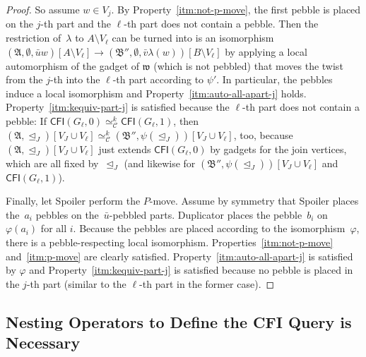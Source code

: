 \documentclass[]{lmcs}
\renewcommand{\phi}{\varphi}
\newcommand{\autoA}{\phi}
\newcommand{\autoB}{\psi}
\newcommand{\tup}[1]{\bar{#1}}
\newcommand{\vertA}{u}
\newcommand{\vertB}{v}
\newcommand{\vertC}{w}
\newcommand{\StructA}{\mathfrak{A}}
\newcommand{\StructB}{\mathfrak{B}}
\newcommand{\StructVA}{A}
\newcommand{\StructVB}{B}
\newcommand{\gamebij}{\lambda}
\newcommand{\CFIsym}{\mathsf{CFI}}
\newcommand{\CFI}[1]{\CFIsym(#1)}
\newcommand{\bVertC}{\mathfrak{w}}
\newcommand{\kequiv}[1]{\simeq^#1_{\mathcal{C}}}
\newcommand{\indRel}{\trianglelefteq}
\begin{document}
\begin{proof}
	So assume $\vertC \in V_j$.
	By Property~\ref{itm:not-p-move},
	the first pebble is placed on the $j$-th part
	and the $\ell$-th part does not contain a pebble.
	Then the restriction of~$\gamebij$ to $\StructVA \setminus V_\ell$
	can be turned into 
	is an isomorphism $ (\StructA, \emptyset, \tup{\vertA}\vertC)[\StructVA \setminus V_\ell] \to 
	(\StructB'', \emptyset, \tup{\vertB}\gamebij(\vertC))[\StructVB \setminus V_\ell]$
	by applying a local automorphism of the gadget of $\bVertC$ (which is not pebbled)
	that moves the twist from the $j$-th into the $\ell$-th part according to $\autoB'$.
	In particular, the pebbles induce a local isomorphism
	and Property~\ref{itm:auto-all-apart-j} holds.
	Property~\ref{itm:kequiv-part-j} is satisfied
	because the $\ell$-th part does not contain a pebble:
	If $\CFI{G_\ell,0} \kequiv{k} \CFI{G_\ell,1}$,
	then $(\StructA, \indRel_J)[V_J \cup V_\ell]  \kequiv{k}
	(\StructB'',\autoB(\indRel_J))[V_J \cup V_\ell]$, too,
	because $(\StructA, \indRel_J)[V_J \cup V_\ell]$
	just extends $\CFI{G_\ell,0}$ by gadgets for the join vertices,
	which are all fixed by~$\indRel_J$
	(and likewise for $(\StructB'',\autoB(\indRel_J))[V_J \cup V_\ell]$ and $\CFI{G_\ell,1}$).
	
	Finally, let Spoiler perform the $P$-move.
	Assume by symmetry that Spoiler places the~$a_i$ pebbles on the~$\tup{\vertA}$-pebbled parts.
	Duplicator places the pebble~$b_i$ on~$\autoA(a_i)$ for all $i$.
	Because the pebbles are placed according to the isomorphism~$\autoA$,
	there is a pebble-respecting local isomorphism.
	Properties~\ref{itm:not-p-move} and~\ref{itm:p-move}
	are clearly satisfied.
	Property~\ref{itm:auto-all-apart-j} is satisfied by $\autoA$
	and Property~\ref{itm:kequiv-part-j} is satisfied
	because no pebble is placed in the $j$-th part
	(similar to the $\ell$-th part in the former case).
\end{proof}


\subsection{Nesting Operators to Define the CFI Query is Necessary}
\label{sec:nesting-operators-is-necessary}
\end{document}
